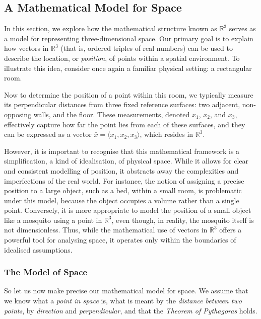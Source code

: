 \subsection{A Mathematical Model for Space}


In this section, we explore how the mathematical structure known as $\mathbb{R}^3$ serves as a model for 
representing three-dimensional space. Our primary goal is to explain how vectors in $\mathbb{R}^3$ 
(that is, ordered triples of real numbers) can be used to describe the location, or \textit{position}, 
of points within a spatial environment. To illustrate this idea, consider once again a familiar physical setting: 
a rectangular room.

\vspace{1em}

Now to determine the position of a point within this room, we typically measure its perpendicular distances from three fixed 
reference surfaces: two adjacent, non-opposing walls, and the floor. These measurements, denoted $x_1$, $x_2$, and $x_3$, 
effectively capture how far the point lies from each of these surfaces, and they can be expressed as a 
vector $\bar{x} = \langle x_1, x_2, x_3 \rangle$, which resides in $\mathbb{R}^3$.

\vspace{1em}

However, it is important to recognise that this mathematical framework is a simplification, a kind of idealisation, of physical space. 
While it allows for clear and consistent modelling of position, it abstracts away the complexities and imperfections of the real 
world. For instance, the notion of assigning a precise position to a large object, such as a bed, within a small room, is problematic 
under this model, because the object occupies a volume rather than a single point. Conversely, it is more appropriate to model the position
of a small object like a mosquito using a point in $\mathbb{R}^3$, even though, in reality, the mosquito itself is not dimensionless. 
Thus, while the mathematical use of vectors in $\mathbb{R}^3$ offers a powerful tool for analysing space, it operates only within the 
boundaries of idealised assumptions.

\subsubsection{The Model of Space}


So let us now make precise our mathematical model for space. We assume that we know what
 a \textit{point in space} is, what is meant by the \textit{distance between two points}, by \textit{direction} and
 \textit{perpendicular}, and that the \textit{Theorem of Pythagoras} holds.

